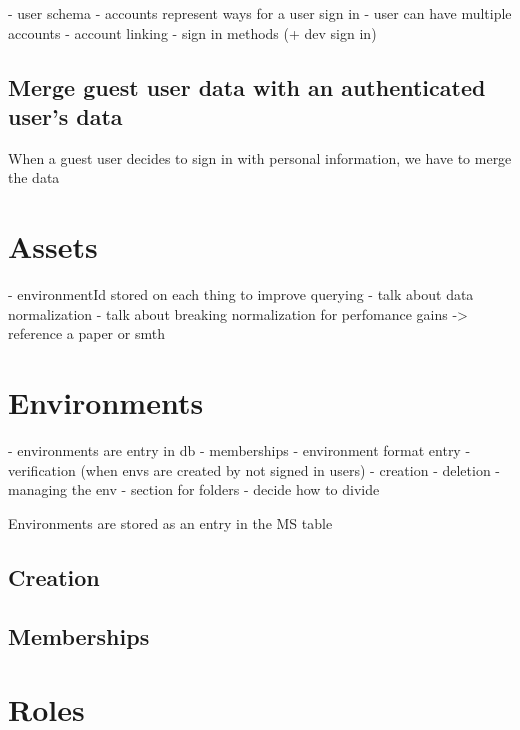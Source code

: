 

- user schema
- accounts represent ways for a user sign in
- user can have multiple accounts
- account linking
- sign in methods (+ dev sign in)



\subsection{Merge guest user data with an authenticated user's data}
\label{cha:ms-architecture:merge-guest-user-data}

When a guest user decides to sign in with personal information, we have to merge the data


\section{Assets}

- environmentId stored on each thing to improve querying
- talk about data normalization
- talk about breaking normalization for perfomance gains -> reference a paper or smth

\section{Environments}

- environments are entry in db
- memberships
- environment format entry
- verification (when envs are created by not signed in users)
- creation
- deletion - managing the env
- section for folders
- decide how to divide 

Environments are stored as an entry in the MS table


\subsection{Creation}
\subsection{Memberships}

\section{Roles}


